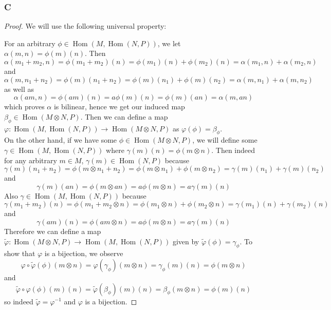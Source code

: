\documentclass{article}
\DeclareMathOperator{\Hom}{\mathrm{Hom}}
\begin{document}
\subsubsection{C}\label{1.5.C}
\begin{proof}
    We will use the following universal property:
    \begin{center}
    \end{center}
    For an arbitrary $\phi\in \Hom(M, \Hom(N,P))$, we let $\alpha(m,n)=\phi(m)(n)$. Then
    \[
    \alpha(m_1+m_2,n)=\phi(m_1+m_2)(n)=\phi(m_1)(n)+\phi(m_2)(n)=\alpha(m_1,n)+\alpha(m_2,n)
    \]
    and
    \[
    \alpha(m,n_1+n_2)=\phi(m)(n_1+n_2)=\phi(m)(n_1)+\phi(m)(n_2)=\alpha(m,n_1)+\alpha(m,n_2)
    \]
    as well as
    \[
    \alpha(am,n)=\phi(am)(n)=a\phi(m)(n)=\phi(m)(an)=\alpha(m,an)
    \]
    which proves $\alpha$ is bilinear, hence we get our induced map $\beta_\phi \in \Hom(M\otimes N, P)$. Then we can define a map $\varphi:\Hom(M, \Hom(N,P))\to \Hom(M\otimes N, P)$ as $\varphi(\phi)=\beta_\phi$.\\
    \newline
    On the other hand, if we have some $\phi \in \Hom(M\otimes N,P)$, we will define some $\gamma \in \Hom(M, \Hom(N,P))$ where $\gamma(m)(n)=\phi(m\otimes n)$. Then indeed for any arbitrary $m\in M$, $\gamma(m)\in \Hom(N,P)$ because
    \[
    \gamma(m)(n_1+n_2)=\phi(m\otimes n_1+n_2)=\phi(m\otimes n_1)+\phi(m\otimes n_2)=\gamma(m)(n_1)+\gamma(m)(n_2)
    \]
    and
    \[
    \gamma(m)(an)=\phi(m\otimes an)=a\phi(m\otimes n)=a\gamma(m)(n)
    \]
    Also $\gamma \in \Hom(M, \Hom(N,P))$ because
    \[
    \gamma(m_1+m_2)(n)=\phi(m_1+m_2\otimes n)=\phi(m_1\otimes n)+\phi(m_2\otimes n)=\gamma(m_1)(n)+\gamma(m_2)(n)
    \]
    and
    \[
    \gamma(am)(n)=\phi(am\otimes n)=a\phi(m\otimes n)=a\gamma(m)(n)
    \]
    Therefore we can define a map $\tilde \varphi:\Hom(M\otimes N,P)\to \Hom(M, \Hom(N,P))$ given by $\tilde \varphi(\phi)=\gamma_\phi$. To show that $\varphi$ is a bijection, we observe
    \[
    \varphi \circ \tilde \varphi(\phi)(m\otimes n)=\varphi(\gamma_\phi)(m\otimes n)=\gamma_\phi(m)(n)=\phi(m\otimes n)
    \]
    and
    \[
    \tilde \varphi\circ \varphi(\phi)(m)(n)=\tilde \varphi(\beta_\phi)(m)(n)=\beta_\phi(m\otimes n)=\phi(m)(n)
    \]
    so indeed $\tilde \varphi=\varphi^{-1}$ and $\varphi$ is a bijection.
\end{proof}
\end{document}
